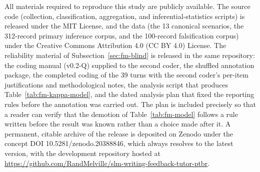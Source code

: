 \documentclass{sbc2023}%
\begin{document}
\begin{materials}
All materials required to reproduce this study are publicly available. The source code (collection, classification, aggregation, and inferential-statistics scripts) is released under the MIT License, and the data (the 13 canonical scenarios, the 312-record primary inference corpus, and the 100-record falsification corpus) under the Creative Commons Attribution 4.0 (CC BY 4.0) License. The reliability material of Subsection~\ref{sec:fm-blind} is released in the same repository: the coding manual (v0.2-Q) supplied to the second coder, the shuffled annotation package, the completed coding of the 39 turns with the second coder's per-item justifications and methodological notes, the analysis script that produces Table~\ref{tab:fm-kappa-model}, and the dated analysis plan that fixed the reporting rules before the annotation was carried out. The plan is included precisely so that a reader can verify that the demotion of Table~\ref{tab:fm-model} follows a rule written before the result was known rather than a choice made after it. A permanent, citable archive of the release is deposited on Zenodo under the concept DOI 10.5281/zenodo.20388846, which always resolves to the latest version, with the development repository hosted at \href{https://github.com/RandMelville/slm-writing-feedback-tutor-ptbr}{https://github.com/RandMelville/slm-writing-feedback-tutor-ptbr}.
\end{materials}




\end{document}
